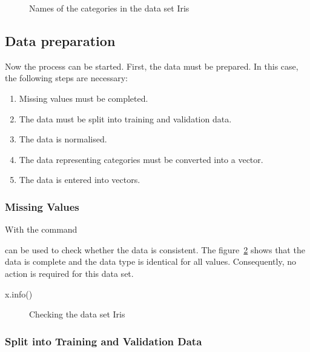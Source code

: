 \begin{figure}[H]
    \caption{Names of the categories in the data set Iris}\label{TensorFlowIrisTypes}
\end{figure}


\subsection{Data preparation}

Now the process can be started. First, the data must be prepared.
In this case, the following steps are necessary: 

\begin{enumerate}
  \item Missing values must be completed.
  \item The data must be split into training and validation data.
  \item The data is normalised.
  \item The data representing categories must be converted into a vector.
  \item The data is entered into vectors.
\end{enumerate}

\subsubsection{Missing Values}

With the command 

\medskip


\medskip

can be used to check whether the data is consistent. The figure~\ref{TensorFlowIrisInfo} shows that the data is complete and the data type is identical for all values. Consequently, no action is required for this data set.

\medskip

x.info()

\medskip

\begin{figure}[H]
    \caption{Checking the data set Iris}\label{TensorFlowIrisInfo}
\end{figure}


\subsubsection{Split into Training and Validation Data}

